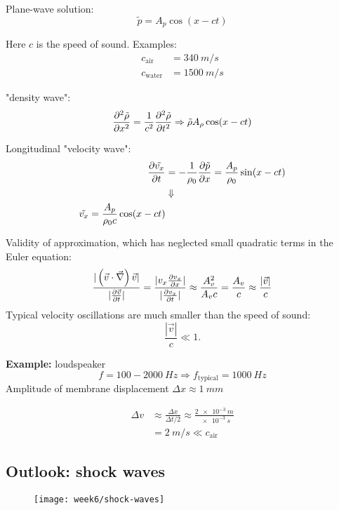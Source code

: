 Plane-wave solution:
\begin{equation}
\tilde{p} = A_p\cos(x-ct)
\end{equation}

Here $c$ is the speed of sound. Examples:
\begin{align}
c_\mathrm{air} &= \SI{340}{m/s} \\
c_\mathrm{water} &= \SI{1500}{m/s}
\end{align}


"density wave":
\begin{equation}
\frac{\partial^2 \tilde{\rho}}{\partial x^2} = \frac{1}{c^2}\frac{\partial^2 \tilde{\rho}}{\partial t^2} \Rightarrow \tilde{\rho}A_\rho\cos(x-ct)
\end{equation}

Longitudinal "velocity wave":
\begin{align}
\frac{\partial \tilde{v_x}}{\partial t} &= -\frac{1}{\rho_0}\frac{\partial \tilde{p}}{\partial x} = \frac{A_p}{\rho_0}\sin(x-ct) \\
&\Downarrow\notag\\
\tilde{v_x} = \frac{A_p}{\rho_0c}\cos(x-ct)
\end{align}

Validity of approximation, which has neglected small quadratic terms in the Euler equation:
\begin{align}
\frac{|\left(\vec{v}\cdot\vec{\nabla}\right)\vec{v}|}{|\frac{\partial \vec{v}}{\partial t}|} = \frac{|v_x\frac{\partial v_x}{\partial x}|}{|\frac{\partial v_x}{\partial t}|} \approx \frac{A_v^2}{A_vc} = \frac{A_v}{c} \approx \frac{|\vec{v}|}{c}
\end{align}
Typical velocity oscillations are much smaller than the speed of sound:
\begin{equation}
\frac{|\vec{v}|}{c} \ll 1.
\end{equation}
\begin{framed}
\textbf{Example:} loudspeaker
\begin{equation}
f=100-\SI{2000}{Hz} \Rightarrow f_\mathrm{typical} = \SI{1000}{Hz}
\end{equation}
Amplitude of membrane displacement $\Delta x \approx \SI{1}{mm}$

\begin{align}
\Delta v &\approx \frac{\Delta x}{\Delta t/2} \approx \frac{\SI{2e-3}{m}}{\SI{e-3}{s}} \\
 &= \SI{2}{m/s} \ll c_\mathrm{air}
\end{align}
\end{framed}

\newpage
\subsection{Outlook: shock waves}
\begin{figure}[!h]
    \centering
    \texttt{[image: week6/shock-waves]}\\
    \caption{}
    \label{fig:shock-waves}
\end{figure}